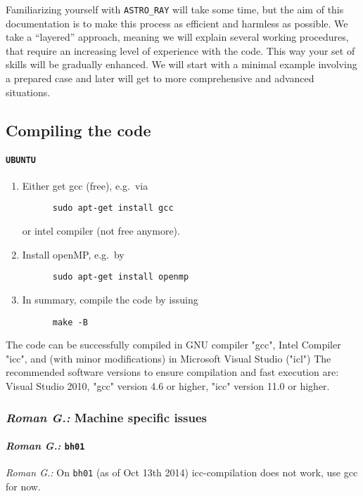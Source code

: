 \documentclass{emulateapj}
\newcommand{\rg}[1]{\color{blue}\textit{Roman G.:} #1\color{black}}
\begin{document}
Familiarizing yourself with {\tt ASTRO\_RAY} will take some time, but
the aim of this documentation is to make this process as efficient and
harmless as possible. We take a ``layered'' approach, meaning we will
explain several working procedures, that require an increasing level of
experience with the code. This way your set of skills will be
gradually enhanced. We will start with a minimal example involving a
prepared case and later will get to more comprehensive and advanced
situations.

\subsection{{\bf Compiling} the code}
\paragraph{{\tt UBUNTU}}

\begin{enumerate}

  \item Either get gcc (free), e.g.~via 
    \begin{verbatim}
      sudo apt-get install gcc
    \end{verbatim}
    or intel compiler (not free anymore).

  \item Install openMP, e.g.~by
    \begin{verbatim}
      sudo apt-get install openmp 
    \end{verbatim}

  \item In summary, compile the code by issuing
    \begin{verbatim}
      make -B
    \end{verbatim}

\end{enumerate}


The code can be successfully compiled in GNU compiler "gcc", Intel
Compiler "icc", and (with minor modifications) in Microsoft Visual
Studio ("icl") The recommended software versions to ensure compilation
and fast execution are: Visual Studio 2010, "gcc" version 4.6 or
higher, "icc" version 11.0 or higher.

\subsubsection{\rg{Machine specific issues}}
\paragraph{\rg{\tt bh01}}
\rg{On {\tt bh01} (as of Oct 13th 2014) icc-compilation does not work,
  use gcc for now.}
\end{document}
